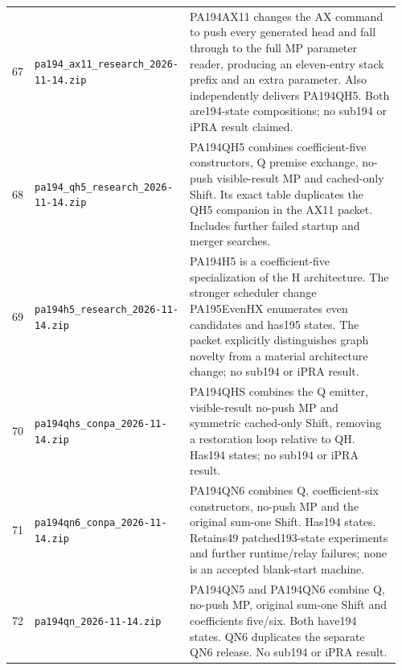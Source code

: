 \begin{longtable}{@{}p{0.035\linewidth}p{0.325\linewidth}p{0.60\linewidth}@{}}
67 & \nolinkurl{pa194_ax11_research_2026-11-14.zip} & PA194AX11 changes the AX command to push every generated head and fall through to the full MP parameter reader, producing an eleven-entry stack prefix and an extra parameter. Also independently delivers PA194QH5. Both are194-state compositions; no sub194 or iPRA result claimed.\\[5pt]
68 & \nolinkurl{pa194_qh5_research_2026-11-14.zip} & PA194QH5 combines coefficient-five constructors, Q premise exchange, no-push visible-result MP and cached-only Shift. Its exact table duplicates the QH5 companion in the AX11 packet. Includes further failed startup and merger searches.\\[5pt]
69 & \nolinkurl{pa194h5_research_2026-11-14.zip} & PA194H5 is a coefficient-five specialization of the H architecture. The stronger scheduler change PA195EvenHX enumerates even candidates and has195 states. The packet explicitly distinguishes graph novelty from a material architecture change; no sub194 or iPRA result.\\[5pt]
70 & \nolinkurl{pa194qhs_conpa_2026-11-14.zip} & PA194QHS combines the Q emitter, visible-result no-push MP and symmetric cached-only Shift, removing a restoration loop relative to QH. Has194 states; no sub194 or iPRA result.\\[5pt]
71 & \nolinkurl{pa194qn6_conpa_2026-11-14.zip} & PA194QN6 combines Q, coefficient-six constructors, no-push MP and the original sum-one Shift. Has194 states. Retains49 patched193-state experiments and further runtime/relay failures; none is an accepted blank-start machine.\\[5pt]
72 & \nolinkurl{pa194qn_2026-11-14.zip} & PA194QN5 and PA194QN6 combine Q, no-push MP, original sum-one Shift and coefficients five/six. Both have194 states. QN6 duplicates the separate QN6 release. No sub194 or iPRA result.\\[5pt]
\bottomrule
\end{longtable}
\endgroup
